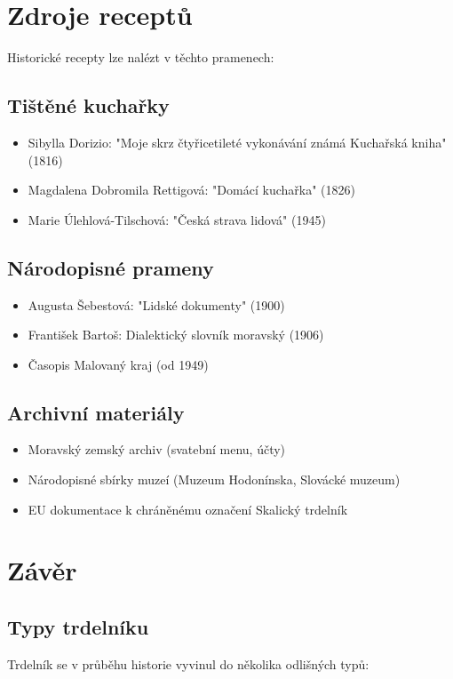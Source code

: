 \documentclass[a5paper,10pt]{book}
\begin{document}
\chapter{Zdroje receptů}
Historické recepty lze nalézt v těchto pramenech:

\section{Tištěné kuchařky}
\begin{itemize}
\item Sibylla Dorizio: "Moje skrz čtyřicetileté vykonávání známá Kuchařská kniha" (1816)
\item Magdalena Dobromila Rettigová: "Domácí kuchařka" (1826)
\item Marie Úlehlová-Tilschová: "Česká strava lidová" (1945)
\end{itemize}

\section{Národopisné prameny}
\begin{itemize}
\item Augusta Šebestová: "Lidské dokumenty" (1900)
\item František Bartoš: Dialektický slovník moravský (1906)
\item Časopis Malovaný kraj (od 1949)
\end{itemize}

\section{Archivní materiály}
\begin{itemize}
\item Moravský zemský archiv (svatební menu, účty)
\item Národopisné sbírky muzeí (Muzeum Hodonínska, Slovácké muzeum)
\item EU dokumentace k chráněnému označení Skalický trdelník
\end{itemize}

\chapter{Závěr}


\section{Typy trdelníku}
Trdelník se v průběhu historie vyvinul do několika odlišných typů:
\end{document}
